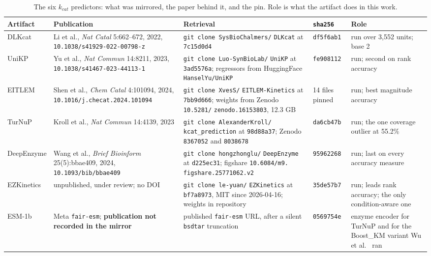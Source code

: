 \begin{table}[!htbp]
  \centering
  \footnotesize
  \caption[$k_{cat}$ sources]{The six $k_{cat}$ predictors: what was mirrored, the paper
  behind it, and the pin. Role is what the artifact does in this work.}
  \label{tab:papers-kcat}
  \begin{tabular}{@{}p{}p{}p{}p{}p{}@{}}
    \hline
    Artifact & Publication & Retrieval & \texttt{sha256} & Role \\
    \hline
    DLKcat & Li et al., \emph{Nat Catal} 5:662--672, 2022,
      \texttt{10.1038/s41929-022-00798-z} &
      \texttt{git clone SysBioChalmers/} \texttt{DLKcat} at
      \texttt{7c15d0d4} & \texttt{df5f6ab1} & run over 3{,}552 units; base 2 \\
    UniKP & Yu et al., \emph{Nat Commun} 14:8211, 2023,
      \texttt{10.1038/s41467-023-44113-1} &
      \texttt{git clone Luo-SynBioLab/} \texttt{UniKP} at \texttt{3ad5576a}; regressors from
      HuggingFace \texttt{HanselYu/UniKP} & \texttt{fe908112} &
      run; second on rank accuracy \\
    EITLEM & Shen et al., \emph{Chem Catal} 4:101094, 2024,
      \texttt{10.1016/j.checat.2024.101094} &
      \texttt{git clone XvesS/} \texttt{EITLEM-Kinetics} at \texttt{7bb9d666}; weights from
      Zenodo \texttt{10.5281/} \texttt{zenodo.16153803}, 12.3 GB &
      14 files pinned & run; best magnitude accuracy \\
    TurNuP~\cite{krollTurnoverNumberPredictions2023} & Kroll et al., \emph{Nat Commun}
      14:4139, 2023 &
      \texttt{git clone AlexanderKroll/} \texttt{kcat\_prediction} at \texttt{98d88a37};
      Zenodo \texttt{8367052} and \texttt{8038678} & \texttt{da6cb47b} &
      run; the one coverage outlier at 55.2\% \\
    DeepEnzyme & Wang et al., \emph{Brief Bioinform} 25(5):bbae409, 2024,
      \texttt{10.1093/bib/bbae409} &
      \texttt{git clone hongzhonglu/} \texttt{DeepEnzyme} at \texttt{d225ec31}; figshare
      \texttt{10.6084/m9.} \texttt{figshare.25771062.v2} & \texttt{95962268} &
      run; last on every accuracy measure \\
    EZKinetics & unpublished, under review; no DOI &
      \texttt{git clone le-yuan/} \texttt{EZKinetics} at \texttt{bf7a8973}, MIT since
      2026-04-16; weights in repository & \texttt{35de57b7} &
      run; leads rank accuracy; the only condition-aware one \\
    ESM-1b & Meta \texttt{fair-esm}; \textbf{publication not recorded in the mirror} &
      published \texttt{fair-esm} URL, after a silent \texttt{bsdtar} truncation &
      \texttt{0569754e} & enzyme encoder for TurNuP and for the Boost\_KM variant Wu et
      al.~\cite{wuSystematicallyExploringYeast2026} ran \\
    \hline
  \end{tabular}
\end{table}

